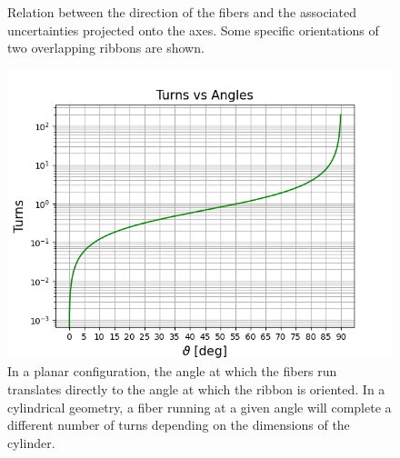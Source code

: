 \begin{refsection}
\begin{figure}
{            \label{fig:CyFi:examples:a}}
            \caption{Relation between the direction of the fibers and the associated uncertainties projected onto the axes. Some specific orientations of two overlapping ribbons are shown.}
        \end{figure}
        \begin{figure}
            \centering
            \includegraphics[width=\textwidth]{Figures/muEDM/CyFi/TurnsVsAngles.png}
            \caption{In a planar configuration, the angle at which the fibers run translates directly to the angle at which the ribbon is oriented. In a cylindrical geometry, a fiber running at a given angle will complete a different number of turns depending on the dimensions of the cylinder.}
            \label{fig:CyFi:TurnsVsAngles}
        \end{figure}

\end{refsection}
